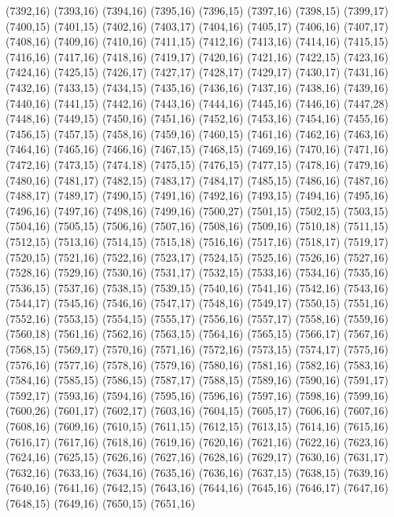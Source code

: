 (7392,16)
(7393,16)
(7394,16)
(7395,16)
(7396,15)
(7397,16)
(7398,15)
(7399,17)
(7400,15)
(7401,15)
(7402,16)
(7403,17)
(7404,16)
(7405,17)
(7406,16)
(7407,17)
(7408,16)
(7409,16)
(7410,16)
(7411,15)
(7412,16)
(7413,16)
(7414,16)
(7415,15)
(7416,16)
(7417,16)
(7418,16)
(7419,17)
(7420,16)
(7421,16)
(7422,15)
(7423,16)
(7424,16)
(7425,15)
(7426,17)
(7427,17)
(7428,17)
(7429,17)
(7430,17)
(7431,16)
(7432,16)
(7433,15)
(7434,15)
(7435,16)
(7436,16)
(7437,16)
(7438,16)
(7439,16)
(7440,16)
(7441,15)
(7442,16)
(7443,16)
(7444,16)
(7445,16)
(7446,16)
(7447,28)
(7448,16)
(7449,15)
(7450,16)
(7451,16)
(7452,16)
(7453,16)
(7454,16)
(7455,16)
(7456,15)
(7457,15)
(7458,16)
(7459,16)
(7460,15)
(7461,16)
(7462,16)
(7463,16)
(7464,16)
(7465,16)
(7466,16)
(7467,15)
(7468,15)
(7469,16)
(7470,16)
(7471,16)
(7472,16)
(7473,15)
(7474,18)
(7475,15)
(7476,15)
(7477,15)
(7478,16)
(7479,16)
(7480,16)
(7481,17)
(7482,15)
(7483,17)
(7484,17)
(7485,15)
(7486,16)
(7487,16)
(7488,17)
(7489,17)
(7490,15)
(7491,16)
(7492,16)
(7493,15)
(7494,16)
(7495,16)
(7496,16)
(7497,16)
(7498,16)
(7499,16)
(7500,27)
(7501,15)
(7502,15)
(7503,15)
(7504,16)
(7505,15)
(7506,16)
(7507,16)
(7508,16)
(7509,16)
(7510,18)
(7511,15)
(7512,15)
(7513,16)
(7514,15)
(7515,18)
(7516,16)
(7517,16)
(7518,17)
(7519,17)
(7520,15)
(7521,16)
(7522,16)
(7523,17)
(7524,15)
(7525,16)
(7526,16)
(7527,16)
(7528,16)
(7529,16)
(7530,16)
(7531,17)
(7532,15)
(7533,16)
(7534,16)
(7535,16)
(7536,15)
(7537,16)
(7538,15)
(7539,15)
(7540,16)
(7541,16)
(7542,16)
(7543,16)
(7544,17)
(7545,16)
(7546,16)
(7547,17)
(7548,16)
(7549,17)
(7550,15)
(7551,16)
(7552,16)
(7553,15)
(7554,15)
(7555,17)
(7556,16)
(7557,17)
(7558,16)
(7559,16)
(7560,18)
(7561,16)
(7562,16)
(7563,15)
(7564,16)
(7565,15)
(7566,17)
(7567,16)
(7568,15)
(7569,17)
(7570,16)
(7571,16)
(7572,16)
(7573,15)
(7574,17)
(7575,16)
(7576,16)
(7577,16)
(7578,16)
(7579,16)
(7580,16)
(7581,16)
(7582,16)
(7583,16)
(7584,16)
(7585,15)
(7586,15)
(7587,17)
(7588,15)
(7589,16)
(7590,16)
(7591,17)
(7592,17)
(7593,16)
(7594,16)
(7595,16)
(7596,16)
(7597,16)
(7598,16)
(7599,16)
(7600,26)
(7601,17)
(7602,17)
(7603,16)
(7604,15)
(7605,17)
(7606,16)
(7607,16)
(7608,16)
(7609,16)
(7610,15)
(7611,15)
(7612,15)
(7613,15)
(7614,16)
(7615,16)
(7616,17)
(7617,16)
(7618,16)
(7619,16)
(7620,16)
(7621,16)
(7622,16)
(7623,16)
(7624,16)
(7625,15)
(7626,16)
(7627,16)
(7628,16)
(7629,17)
(7630,16)
(7631,17)
(7632,16)
(7633,16)
(7634,16)
(7635,16)
(7636,16)
(7637,15)
(7638,15)
(7639,16)
(7640,16)
(7641,16)
(7642,15)
(7643,16)
(7644,16)
(7645,16)
(7646,17)
(7647,16)
(7648,15)
(7649,16)
(7650,15)
(7651,16)
